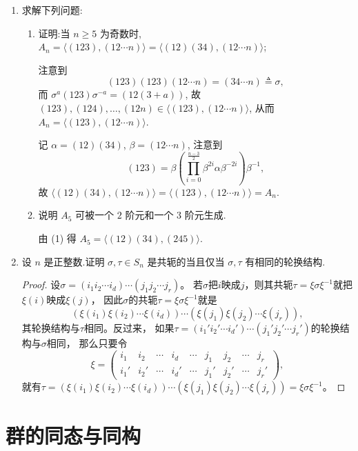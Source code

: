 \begin{enumerate}
\item 求解下列问题:
\begin{enumerate}[label=(\arabic*)]
\item 证明:当 $n \geqslant 5$ 为奇数时, $A_n=\langle(123),(12 \cdots n)\rangle=\langle(12)(34),(12 \cdots n)\rangle$;
\begin{solution}
    注意到
    $$(123)(123)(12\cdots n) = (34\cdots n) \triangleq \sigma,$$
    而 $\sigma^a (123)\sigma^{-a} = (12(3+a))$,
    故 $(123),(124),\dots,(12n) \in \langle (123),(12\cdots n) \rangle$,
    从而 $A_n = \langle (123),(12\cdots n) \rangle$.

    记 $\alpha = (12)(34)$, $\beta = (12\cdots n)$, 注意到
    $$(123) = \beta \left( \prod_{i=0}^{\frac{n-3}{2}} \beta^{2i} \alpha \beta^{-2i} \right) \beta^{-1},$$
    故 $\langle(12)(34),(12 \cdots n)\rangle = \langle(123),(12 \cdots n)\rangle = A_n$. 
\end{solution}

\item 说明 $A_5$ 可被一个 $2$ 阶元和一个 $3$ 阶元生成.
\begin{solution}
    由 (1) 得 $A_5 = \langle (12)(34), (245) \rangle$. 
\end{solution}

\end{enumerate}

\item 设 $n$ 是正整数.证明 $\sigma, \tau \in S_n$ 是共轭的当且仅当 $\sigma, \tau$ 有相同的轮换结构.
\begin{proof}
    设$\sigma=(i_1 i_2 \cdots i_d)\cdots(j_1 j_2 \cdots j_r)$。
    若$\sigma$把$i$映成$j$，则其共轭$\tau=\xi\sigma\xi^{-1}$就把$\xi(i)$映成$\xi(j)$，
    因此$\sigma$的共轭$\tau=\xi\sigma\xi^{-1}$就是
    \[(\xi(i_1)\xi(i_2)\cdots\xi(i_d))\cdots(\xi(j_1)\xi(j_2)\cdots\xi(j_r)),\]
    其轮换结构与$\tau$相同。反过来，
    如果$\tau=(i_1' i_2' \cdots i_d')\cdots(j_1' j_2' \cdots j_r')$的轮换结构与$\sigma$相同，
    那么只要令\[\xi=\begin{pmatrix}i_1&i_2&\cdots&i_d&\cdots&j_1&j_2&\cdots&j_r\\
    i_1'&i_2'&\cdots&i_d'&\cdots&j_1'&j_2'&\cdots&j_r'\end{pmatrix},\]
    就有$\tau=(\xi(i_1)\xi(i_2)\cdots\xi(i_d))\cdots(\xi(j_1)\xi(j_2)\cdots\xi(j_r))=\xi\sigma\xi^{-1}$。
\end{proof}
\end{enumerate}

\section{群的同态与同构}

